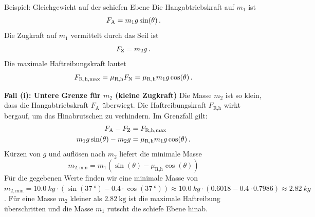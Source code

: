 \begin{examplebox}[lower separated=true, breakable]{Beispiel: Gleichgewicht auf der schiefen Ebene}
Die Hangabtriebskraft auf $m_1$ ist 
\begin{equation}
    F_{\text{A}} = m_1 g \sin(\theta) \,.
\end{equation}
Die Zugkraft auf $m_1$ vermittelt durch das Seil ist 
\begin{equation}
    F_{\text{Z}} = m_2 g \,.
\end{equation}
Die maximale Haftreibungskraft lautet 
\begin{equation}
    F_{\text{R,h,max}} = \mu_{\text{R,h}} F_{\text{N}} = \mu_{\text{R,h}} m_1 g \cos(\theta)\,.
\end{equation}

\textbf{Fall (i): Untere Grenze für $m_2$ (kleine Zugkraft)}\newline
Die Masse $m_2$ ist so klein, dass die Hangabtriebskraft $F_{\text{A}}$ überwiegt. Die Haftreibungskraft $F_{\text{R,h}}$ wirkt bergauf, um das Hinabrutschen zu verhindern. Im Grenzfall gilt:
\begin{equation}\begin{aligned}
    F_{\text{A}} - F_{\text{Z}} &= F_{\text{R,h,max}} \\
    m_1 g \sin(\theta) - m_2 g &= \mu_{\text{R,h}} m_1 g \cos(\theta) \,.
\end{aligned}\end{equation}
Kürzen von $g$ und auflösen nach $m_2$ liefert die minimale Masse
\begin{equation}
    m_{2,\text{min}} = m_1 (\sin(\theta) - \mu_{\text{R,h}} \cos(\theta))
\end{equation}
Für die gegebenen Werte finden wir eine minimale Masse von $m_{2,\text{min}} = \SI{10.0}{kg} \cdot (\sin(\SI{37}{\degree}) - 0.4 \cdot \cos(\SI{37}{\degree})) \approx \SI{10.0}{kg} \cdot (0.6018 - 0.4 \cdot 0.7986) \approx \SI{2.82}{kg}$.\newline
Für eine Masse $m_2$ kleiner als $\SI{2.82}{\kilo\gram}$ ist die maximale Haftreibung überschritten und die Masse $m_1$ rutscht die schiefe Ebene hinab. \\


\end{examplebox}
